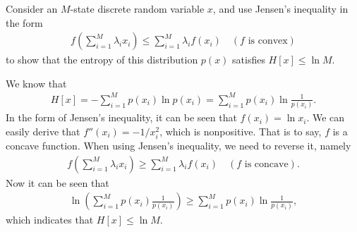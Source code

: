 \begin{question}{1.29}
	Consider an $M$-state discrete random variable $x$, and use Jensen's inequality in the form
	\begin{align*}
		f\left( \sum_{i = 1}^{M} \lambda_i x_i \right) \leq \sum_{i = 1}^{M} \lambda_i f(x_i) \quad (\mbox{$f$ is convex})
	\end{align*}
	to show that the entropy of this distribution $p(x)$ satisfies $H[x] \leq \ln M$.
\end{question}

\begin{answer}{}
	We know that
	\begin{align}
		H[x] = -\sum_{i = 1}^{M} p(x_i) \ln p(x_i) = \sum_{i = 1}^{M} p(x_i) \ln \frac{1}{p(x_i)}.
	\end{align}
	In the form of Jensen's inequality, it can be seen that $f(x_i) = \ln x_i$. We can easily derive that $f''(x_i) = -1 / x_i^2$, which is nonpositive. That is to say, $f$ is a concave function. When using Jensen's inequality, we need to reverse it, namely
	\begin{align}
		f\left( \sum_{i = 1}^{M} \lambda_i x_i \right) \geq \sum_{i = 1}^{M} \lambda_i f(x_i) \quad (\mbox{$f$ is concave}).
	\end{align}
	Now it can be seen that
	\begin{align}
		\ln\left( \sum_{i = 1}^{M} p(x_i)\frac{1}{p(x_i)}\right) \geq  \sum_{i = 1}^{M} p(x_i) \ln \frac{1}{p(x_i)},
	\end{align}
	which indicates that $H[x] \leq \ln M$.
\end{answer}